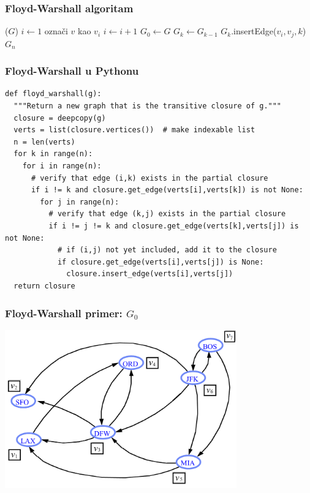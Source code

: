 \documentclass[compress,aspectratio=169]{beamer}
\begin{document}
\begin{frame}[fragile,shrink=10]
  \frametitle{Floyd-Warshall algoritam}
  \begin{algorithmic}
    \STATE {}($G$)
    \STATE $i \leftarrow 1$
      \STATE označi $v$ kao $v_{i}$
      \STATE $i \leftarrow i+1$
    \ENDFOR
    \STATE $G_{0} \leftarrow G$
      \STATE $G_{k} \leftarrow G_{k-1}$
              \STATE $G_{k}$.insertEdge($v_{i},v_{j},k$)
            \ENDIF
          \ENDIF
        \ENDFOR
      \ENDFOR
    \ENDFOR
    \RETURN $G_{n}$
  \end{algorithmic}
\end{frame}

\begin{frame}[fragile,shrink=23]
  \frametitle{Floyd-Warshall u Pythonu}
\begin{verbatim}
def floyd_warshall(g):
  """Return a new graph that is the transitive closure of g."""
  closure = deepcopy(g)
  verts = list(closure.vertices())  # make indexable list
  n = len(verts)
  for k in range(n):
    for i in range(n):
      # verify that edge (i,k) exists in the partial closure
      if i != k and closure.get_edge(verts[i],verts[k]) is not None:
        for j in range(n):
          # verify that edge (k,j) exists in the partial closure
          if i != j != k and closure.get_edge(verts[k],verts[j]) is not None:
            # if (i,j) not yet included, add it to the closure
            if closure.get_edge(verts[i],verts[j]) is None:
              closure.insert_edge(verts[i],verts[j])
  return closure
\end{verbatim}
\end{frame}

\begin{frame}[fragile]
  \frametitle{Floyd-Warshall primer: $G_0$}
  \begin{center}
    \includegraphics[width=10cm]{asp-14-pic37.png}
  \end{center}
\end{frame}
\end{document}
